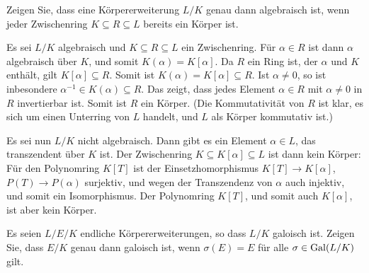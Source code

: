 \begin{question}[subtitle = Charakterisierung algebraischer Erweiterungen durch Zwischenringe]
  Zeigen Sie, dass eine Körpererweiterung $L/K$ genau dann algebraisch ist, wenn jeder Zwischenring $K \subseteq R \subseteq L$ bereits ein Körper ist.
\end{question}


\begin{solution}
  Es sei $L/K$ algebraisch und $K \subseteq R \subseteq L$ ein Zwischenring.
  Für $\alpha \in R$ ist dann $\alpha$ algebraisch über $K$, und somit $K(\alpha) = K[\alpha]$.
  Da $R$ ein Ring ist, der $\alpha$ und $K$ enthält, gilt $K[\alpha] \subseteq R$.
  Somit ist $K(\alpha) = K[\alpha] \subseteq R$.
  Ist $\alpha \neq 0$, so ist inbesondere $\alpha^{-1} \in K(\alpha) \subseteq R$.
  Das zeigt, dass jedes Element $\alpha \in R$ mit $\alpha \neq 0$ in $R$ invertierbar ist.
  Somit ist $R$ ein Körper.
  (Die Kommutativität von $R$ ist klar, es sich um einen Unterring von $L$ handelt, und $L$ als Körper kommutativ ist.)
  
  Es sei nun $L/K$ nicht algebraisch.
  Dann gibt es ein Element $\alpha \in L$, das transzendent über $K$ ist.
  Der Zwischenring $K \subseteq K[\alpha] \subseteq L$ ist dann kein Körper:
  Für den Polynomring $K[T]$ ist der Einsetzhomorphismus $K[T] \to K[\alpha]$, $P(T) \to P(\alpha)$ surjektiv, und wegen der Transzendenz von $\alpha$ auch injektiv, und somit ein Isomorphismus.
  Der Polynomring $K[T]$, und somit auch $K[\alpha]$, ist aber kein Körper.
\end{solution}


\begin{question}[subtitle = Charakterisierung galoischer Unterkörper]
  Es seien $L/E/K$ endliche Körpererweiterungen, so dass $L/K$ galoisch ist.
  Zeigen Sie, dass $E/K$ genau dann galoisch ist, wenn $\sigma(E) = E$ für alle $\sigma \in \operatorname{Gal}(L/K)$ gilt.
\end{question}


